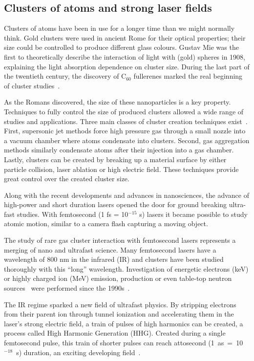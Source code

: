 \subsection{Clusters of atoms and strong laser fields}

Clusters of atoms have been in use for a longer time than we might normally
think. Gold clusters were used in ancient Rome for their optical
properties; their size could be controlled to produce different glass colours.
Gustav Mie was the first to theoretically describe the interaction of light
with (gold) spheres in 1908, explaining the light absorption dependence
on cluster size. During the last part of the twentieth century, the discovery of
C$_{60}$ fullerenes marked the real beginning of cluster studies~\cite{Reinhard2004}.

As the Romans discovered, the size of these nanoparticles is a key property. Techniques to fully
control the size of produced clusters allowed a wide range of studies and
applications. Three main classes of cluster creation techniques
exist~\cite{Reinhard2004}. First, supersonic jet methods force high pressure
gas through a small nozzle into a vacuum chamber where atoms condensate into
clusters. Second, gas aggregation methods similarly condensate atoms after
their injection into a gas chamber. Lastly, clusters can be created by breaking
up a material surface by either particle collision, laser ablation or high
electric field. These techniques provide great control over the created cluster
size.

Along with the recent developments and advances in nanosciences,
the advance of high-power and short duration lasers opened the
door for ground breaking ultra-fast studies. With femtosecond
(1 fs = 10$^{-15}$ s) lasers it became possible to study atomic motion,
similar to a camera flash capturing a moving object.


The study of rare gas cluster interaction with femtosecond lasers represents a
merging of nano and ultrafast science.
%
Many femtosecond lasers
have a wavelength of 800 nm in the infrared (IR) and clusters have been studied
thoroughly with this ``long'' wavelength. Investigation of energetic
electrons (keV) or highly charged ion (MeV) emission, \xray production or even
table-top neutron sources~\cite{Krainov2007} were performed since the
1990s~\cite{Haberland1994,Brabec2009}.


The IR regime sparked a new field of ultrafast physics. By stripping electrons
from their parent ion through tunnel ionization and accelerating them in the
laser's strong electric field, a train of pulses of high harmonics can be created,
a process called High Harmonic Generation (HHG).
Created during a single femtosecond pulse, this train of shorter pulses
can reach attosecond \mbox{(1 as = 10$^{-18}$ s)} duration, an exciting
developing field~\cite{Levesque2006}.


